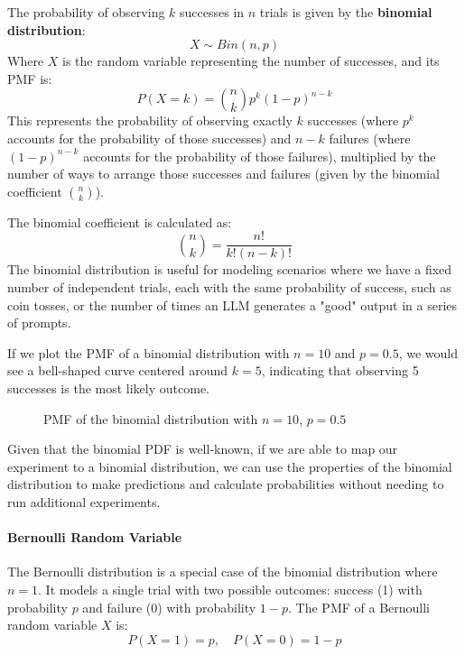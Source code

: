 The probability of observing $k$ successes in $n$ trials is given by the \textbf{binomial distribution}:
\begin{equation}
    X \sim Bin(n, p)
\end{equation}
Where $X$ is the random variable representing the number of successes, and its PMF is:
\begin{equation}
    P(X=k) = \binom{n}{k} p^k (1-p)^{n-k}
\end{equation}
This represents the probability of observing exactly $k$ successes (where $p^k$ accounts for the probability of those successes) and $n-k$ failures (where $(1-p)^{n-k}$ accounts for the probability of those failures), 
multiplied by the number of ways to arrange those successes and failures (given by the binomial coefficient $\binom{n}{k}$).

The binomial coefficient is calculated as:
\begin{equation}
    \binom{n}{k} = \frac{n!}{k!(n-k)!}
\end{equation}
The binomial distribution is useful for modeling scenarios where we have a fixed number of independent trials, 
each with the same probability of success, such as coin tosses, or the number of times an LLM generates a "good" output in a series of prompts.

If we plot the PMF of a binomial distribution with $n=10$ and $p=0.5$, we would see a bell-shaped curve centered around $k=5$, 
indicating that observing 5 successes is the most likely outcome.
\begin{figure}[h]
    \centering
    
    \caption{PMF of the binomial distribution with $n=10$, $p=0.5$}
\end{figure}

Given that the binomial PDF is well-known, if we are able to map our experiment to a binomial distribution, 
we can use the properties of the binomial distribution to make predictions and calculate probabilities without needing to run additional experiments.

\paragraph{Bernoulli Random Variable}
The Bernoulli distribution is a special case of the binomial distribution where $n=1$.
It models a single trial with two possible outcomes: success (1) with probability $p$ and failure (0) with probability $1-p$.
The PMF of a Bernoulli random variable $X$ is:
\begin{equation}
    P(X=1) = p, \quad P(X=0) = 1-p
\end{equation}

